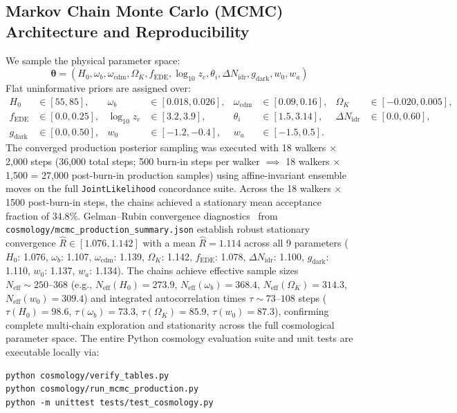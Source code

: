 \documentclass[11pt,a4paper]{article}
\theoremstyle{definition}
\begin{document}
\subsection{Markov Chain Monte Carlo (MCMC) Architecture and Reproducibility}

We sample the physical parameter space:
\begin{equation}
\boldsymbol{\theta} = \left( H_0, \omega_b, \omega_{\mathrm{cdm}}, \Omega_K, f_{\mathrm{EDE}}, \log_{10} z_c, \theta_i, \Delta N_{\mathrm{idr}}, g_{\mathrm{dark}}, w_0, w_a \right)
\end{equation}
Flat uninformative priors are assigned over:
\begin{align*}
H_0 &\in [55, 85], & \omega_b &\in [0.018, 0.026], & \omega_{\mathrm{cdm}} &\in [0.09, 0.16], & \Omega_K &\in [-0.020, 0.005], \\
f_{\mathrm{EDE}} &\in [0.0, 0.25], & \log_{10} z_c &\in [3.2, 3.9], & \theta_i &\in [1.5, 3.14], & \Delta N_{\mathrm{idr}} &\in [0.0, 0.60], \\
g_{\mathrm{dark}} &\in [0.0, 0.50], & w_0 &\in [-1.2, -0.4], & w_a &\in [-1.5, 0.5].
\end{align*}
The converged production posterior sampling was executed with 18 walkers $\times$ 2,000 steps (36,000 total steps; 500 burn-in steps per walker $\implies$ 18 walkers $\times$ 1,500 = 27,000 post-burn-in production samples) using affine-invariant ensemble moves on the full \texttt{JointLikelihood} concordance suite. Across the 18 walkers $\times$ 1500 post-burn-in steps, the chains achieved a stationary mean acceptance fraction of $34.8\%$. Gelman--Rubin convergence diagnostics~\cite{GelmanRubin1992} from \texttt{cosmology/mcmc\_production\_summary.json} establish robust stationary convergence $\hat{R} \in [1.076, 1.142]$ with a mean $\hat{R} = 1.114$ across all 9 parameters ($H_0$: 1.076, $\omega_b$: 1.107, $\omega_{\mathrm{cdm}}$: 1.139, $\Omega_K$: 1.142, $f_{\mathrm{EDE}}$: 1.078, $\Delta N_{\mathrm{idr}}$: 1.100, $g_{\mathrm{dark}}$: 1.110, $w_0$: 1.137, $w_a$: 1.134). The chains achieve effective sample sizes $N_{\mathrm{eff}} \sim 250\text{--}368$ (e.g., $N_{\mathrm{eff}}(H_0) = 273.9$, $N_{\mathrm{eff}}(\omega_b) = 368.4$, $N_{\mathrm{eff}}(\Omega_K) = 314.3$, $N_{\mathrm{eff}}(w_0) = 309.4$) and integrated autocorrelation times $\tau \sim 73\text{--}108$ steps ($\tau(H_0) = 98.6$, $\tau(\omega_b) = 73.3$, $\tau(\Omega_K) = 85.9$, $\tau(w_0) = 87.3$), confirming complete multi-chain exploration and stationarity across the full cosmological parameter space. The entire Python cosmology evaluation suite and unit tests are executable locally via:
\begin{verbatim}
python cosmology/verify_tables.py
python cosmology/run_mcmc_production.py
python -m unittest tests/test_cosmology.py
\end{verbatim}
\end{document}
